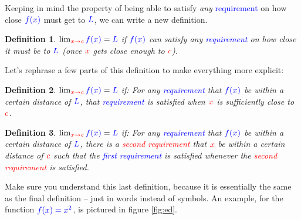 \documentclass{myarticle}
\newcommand{\hor}[1]{\textcolor{red}{#1}}
\newcommand{\ver}[1]{\textcolor{blue}{#1}}
\theoremstyle{nospace}
\newtheorem*{oldattempt}{Definition}
\newenvironment{attempt}
{\begin{mdframed}\begin{oldattempt}}
    {\end{oldattempt}\end{mdframed}}
\newtheorem{old series theorem}{Theorem}
\newenvironment{series theorem}
{\begin{mdframed}\begin{old series theorem}}
    {\end{old series theorem}\end{mdframed}}
\begin{document}
Keeping in mind the property of being able to satisfy \emph{any}
\ver{requirement} on how close $\ver{f(x)}$ must get to $\ver{L}$, we
can write a new definition.

\begin{attempt}
  $\lim_{\hor{x \to c}} \ver{f(x)} = \ver{L}$ if $\ver{f(x)}$ can
  satisfy any \ver{requirement} on how close it must be to $\ver{L}$
  (once $\hor{x}$ gets close enough to $\hor{c}$).
\end{attempt}

Let's rephrase a few parts of this definition to make everything more
explicit:

\begin{attempt}
  $\lim_{\hor{x \to c}} \ver{f(x)} = \ver{L}$ if: For any
  \ver{requirement} that $\ver{f(x)}$ be within a certain distance of
  $\ver{L}$, that \ver{requirement} is satisfied when $\hor{x}$ is
  sufficiently close to $\hor{c}$.
\end{attempt}

\begin{attempt}
  $\lim_{\hor{x \to c}} \ver{f(x)} = \ver{L}$ if: For any
  \ver{requirement} that $\ver{f(x)}$ be within a certain distance of
  $\ver{L}$, there is a \hor{second requirement} that $\hor{x}$ be
  within a certain distance of $\hor{c}$ such that the \ver{first
    requirement} is satisfied whenever the \hor{second requirement} is
  satisfied.
\end{attempt}

Make sure you understand this last definition, because it is
essentially the same as the final definition -- just in words instead
of symbols. An example, for the function $\ver{f(x) = x^2}$, is
pictured in figure \ref{fig:ed}.
\end{document}
